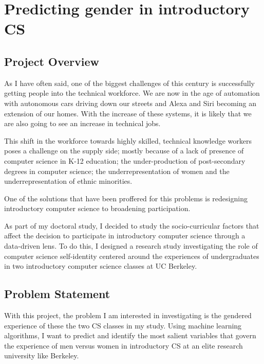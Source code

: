 
\chapter*{Predicting gender in introductory CS}

\section*{Project Overview}

As I have often said, one of the biggest challenges of this century is successfully getting people into the technical workforce. We are now in the age of automation with autonomous cars driving down our streets and Alexa and Siri becoming an extension of our homes. With the increase of these systems, it is likely that we are also going to see an increase in technical jobs.

This shift in the workforce towards highly skilled, technical knowledge workers poses a challenge on the supply side; mostly because of a lack of presence of computer science in K-12 education; the under-production of post-secondary degrees in computer science;  the underrepresentation of women and the underrepresentation of ethnic minorities.

One of the solutions that have been proffered for this problems is redesigning introductory computer science to broadening participation.  

As part of my doctoral study, I decided to study the socio-curricular factors that affect the decision to participate in introductory computer science through a data-driven lens. To do this, I designed a research study investigating the role of computer science self-identity centered around the experiences of undergraduates in two introductory computer science classes at UC Berkeley.


\section*{Problem Statement}

With this project, the problem I am interested in investigating is the gendered experience of these the two CS classes in my study. Using machine learning algorithms, I want to predict and identify the most salient variables that govern the experience of men versus women in introductory CS at an elite research university like Berkeley.

